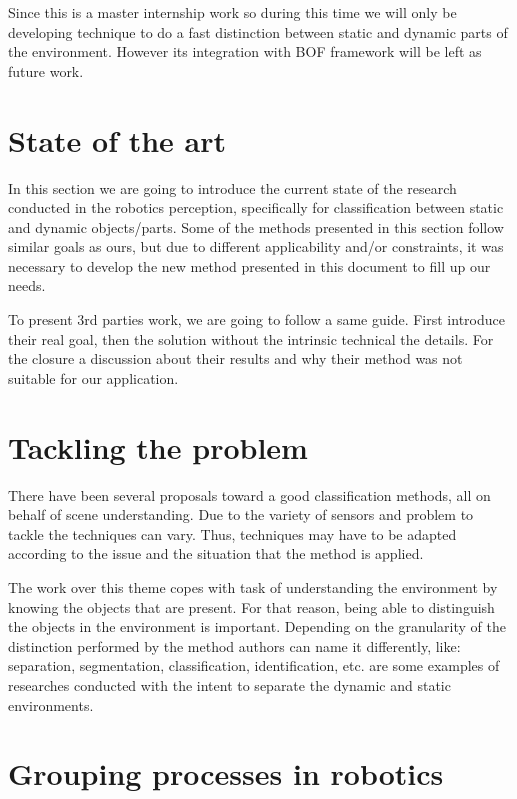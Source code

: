 Since this is a master internship work so during this time we will only be developing technique to do a fast distinction between static and dynamic parts of the environment. However its integration with BOF framework will be left as future work.

\section{State of the art}
In this section we are going to introduce the current state of the research conducted in the robotics perception, specifically for classification between static and dynamic objects/parts. Some of the methods presented in this section follow similar goals as ours, but due to different applicability and/or constraints, it was necessary to develop the new method presented in this document to fill up our needs.

To present 3rd parties work, we are going to follow a same guide. First introduce their real goal, then the solution without the intrinsic technical the details. For the closure a discussion about their results and why their method was not suitable for our application.

\section{Tackling the problem}

There have been several proposals toward a good classification methods, all on behalf of scene understanding. Due to the variety of sensors and problem to tackle the techniques can vary. Thus, techniques may have to be adapted according to the issue and the situation that the method is applied.

The work over this theme copes with task of understanding the environment by knowing the objects that are present. For that reason, being able to distinguish the objects in the environment is important. Depending on the granularity of the distinction performed by the method authors can name it differently, like: separation, segmentation, classification, identification, etc. \cite{Wolf04onlinesimultaneous} \cite{DBLP:conf/iros/LidorisWB08} are some examples of researches conducted with the intent to separate the dynamic and static environments.

\section{Grouping processes in robotics}

